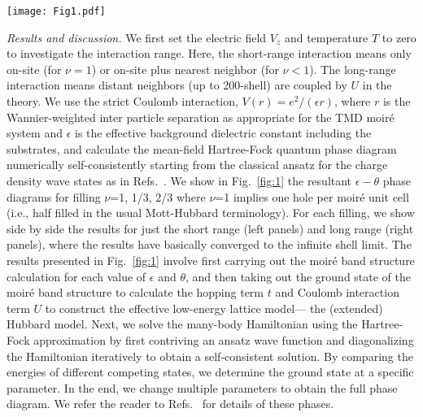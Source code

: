 \documentclass[aps,prb,twocolumn,superscriptaddress,longbibliography]{revtex4-2}
\newcommand{\anno}[1]{}
\begin{document}
\begin{figure*}[ht]
    \centering 
    \texttt{[image: Fig1.pdf]}
    \caption{Phase diagrams as a function of the twist angle $\theta$ and dielectric constant $\epsilon$ at (a) and (b) $\nu=1$; (c) and (d) $\nu=1/3$; (e) and (f) $\nu=2/3$. The left column is for the short-range interaction while the right column is for the long-range interaction. Here, ``T'' means the triangular lattice, ``HC'' means the honeycomb lattice, ``No'' means no CDW, ``NM'' means spinless normal metal, ``M'' means the phase is a metal, and ``I'' means the phase is an insulator. The numbers in the parentheses indicate the extended periods of each phase which are shown in (g)-(l).
    }
    \label{fig:1}
\end{figure*}



\textit{Results and discussion.} We first set the electric field $V_z$ and temperature $T$ to zero to investigate the interaction range.
Here, the short-range interaction means only on-site (for $\nu=1$) or on-site plus nearest neighbor (for $\nu<1$). The long-range interaction means distant neighbors (up to 200-shell) are coupled by $U$ in the theory.
We use the strict Coulomb interaction, $V(r) = e^2/(\epsilon r)$, where $r$ is the Wannier-weighted inter particle separation as appropriate for the TMD moir\'e system and $\epsilon$ is the effective background dielectric constant including the substrates, and calculate the mean-field Hartree-Fock quantum phase diagram numerically self-consistently starting from the classical ansatz for the charge density wave states as in Refs.~\anno{ [ cite earlier works where this is clearly explained]}.  
We show in Fig.~\ref{fig:1} the resultant $\epsilon-\theta$ phase diagrams for filling $\nu$=1, 1/3, 2/3 where $\nu$=1 implies one hole per moir\'e unit cell (i.e., half filled in the usual Mott-Hubbard terminology).  For each filling, we show side by side the results for just the short range (left panels) and long range (right panels), where the results have basically converged to the infinite shell limit.  
The results presented in Fig.~\ref{fig:1} involve first carrying out the moir\'e band structure calculation for each value of $\epsilon$ and $\theta$, and then taking out the ground state of the moir\'e band structure to calculate the hopping term $t$ and Coulomb interaction term $U$ to construct the effective low-energy lattice model--- the (extended) Hubbard model. Next, we solve the many-body Hamiltonian using the Hartree-Fock approximation by first contriving an ansatz wave function and diagonalizing the Hamiltonian iteratively to obtain a self-consistent solution. By comparing the energies of different competing states, we determine the ground state at a specific parameter. In the end, we change multiple parameters to obtain the full phase diagram.
We refer the reader to Refs.~ for details of these phases.
\end{document}
